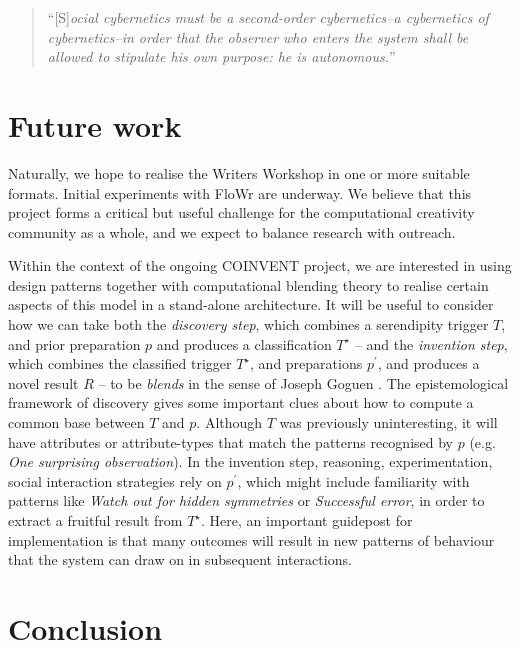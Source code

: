 \documentclass{llncs}
\begin{document}
\begin{quote}
``[S]\emph{ocial cybernetics must be a second-order cybernetics--a
    cybernetics of cybernetics--in order that the observer who enters
    the system shall be allowed to stipulate his own purpose: he is
    autonomous.}'' \cite[p. 286]{von2003essays}
\end{quote}

\section{Future work}

Naturally, we hope to realise the Writers Workshop in one or more
suitable formats.  Initial experiments with {\sf FloWr} are underway.
We believe that this project forms a critical but useful challenge for
the computational creativity community as a whole, and we expect to
balance research with outreach.

Within the context of the ongoing COINVENT project, we are interested
in using design patterns together with computational blending theory
to realise certain aspects of this model in a stand-alone
architecture.
%
It will be useful to consider how we can take both the \emph{discovery
  step}, which combines a serendipity trigger $T$, and prior
preparation $p$ and produces a classification $T^{\star}$ -- and the
\emph{invention step}, which combines the classified trigger
$T^{\star}$, and preparations $p^{\prime}$, and produces a novel
result $R$ -- to be \emph{blends} in the sense of Joseph Goguen
\cite{goguen1999introduction}.  The epistemological framework of
discovery gives some important clues about how to compute a common
base between $T$ and $p$.  Although $T$ was previously uninteresting,
it will have attributes or attribute-types that match the patterns
recognised by $p$ (e.g. \emph{One surprising observation}).  In the
invention step, reasoning, experimentation, social interaction
strategies rely on $p^{\prime}$, which might include familiarity with
patterns like \emph{Watch out for hidden symmetries} or
\emph{Successful error}, in order to extract a fruitful result from
$T^{\star}$.  Here, an important guidepost for implementation is that
many outcomes will result in new patterns of behaviour that the system
can draw on in subsequent interactions.

\section{Conclusion}
\end{document}
